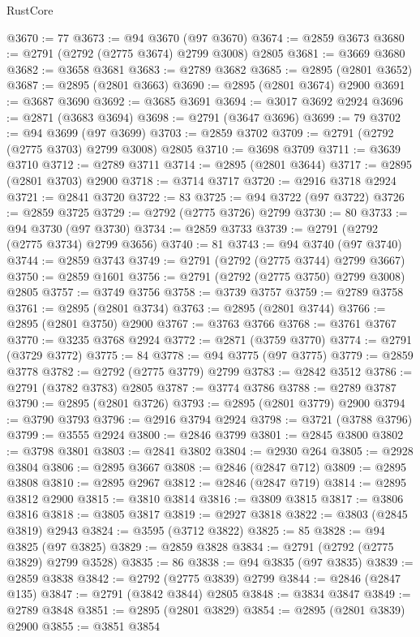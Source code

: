 \begin{lexlean}{RustCore}
\begin{coremodule}
@3670 := 77
@3673 := @94 @3670 (@97 @3670)
@3674 := @2859 @3673
@3680 := @2791 (@2792 (@2775 @3674) @2799 @3008) @2805
@3681 := @3669 @3680
@3682 := @3658 @3681
@3683 := @2789 @3682
@3685 := @2895 (@2801 @3652)
@3687 := @2895 (@2801 @3663)
@3690 := @2895 (@2801 @3674) @2900
@3691 := @3687 @3690
@3692 := @3685 @3691
@3694 := @3017 @3692 @2924
@3696 := @2871 (@3683 @3694)
@3698 := @2791 (@3647 @3696)
@3699 := 79
@3702 := @94 @3699 (@97 @3699)
@3703 := @2859 @3702
@3709 := @2791 (@2792 (@2775 @3703) @2799 @3008) @2805
@3710 := @3698 @3709
@3711 := @3639 @3710
@3712 := @2789 @3711
@3714 := @2895 (@2801 @3644)
@3717 := @2895 (@2801 @3703) @2900
@3718 := @3714 @3717
@3720 := @2916 @3718 @2924
@3721 := @2841 @3720
@3722 := 83
@3725 := @94 @3722 (@97 @3722)
@3726 := @2859 @3725
@3729 := @2792 (@2775 @3726) @2799
@3730 := 80
@3733 := @94 @3730 (@97 @3730)
@3734 := @2859 @3733
@3739 := @2791 (@2792 (@2775 @3734) @2799 @3656)
@3740 := 81
@3743 := @94 @3740 (@97 @3740)
@3744 := @2859 @3743
@3749 := @2791 (@2792 (@2775 @3744) @2799 @3667)
@3750 := @2859 @1601
@3756 := @2791 (@2792 (@2775 @3750) @2799 @3008) @2805
@3757 := @3749 @3756
@3758 := @3739 @3757
@3759 := @2789 @3758
@3761 := @2895 (@2801 @3734)
@3763 := @2895 (@2801 @3744)
@3766 := @2895 (@2801 @3750) @2900
@3767 := @3763 @3766
@3768 := @3761 @3767
@3770 := @3235 @3768 @2924
@3772 := @2871 (@3759 @3770)
@3774 := @2791 (@3729 @3772)
@3775 := 84
@3778 := @94 @3775 (@97 @3775)
@3779 := @2859 @3778
@3782 := @2792 (@2775 @3779) @2799
@3783 := @2842 @3512
@3786 := @2791 (@3782 @3783) @2805
@3787 := @3774 @3786
@3788 := @2789 @3787
@3790 := @2895 (@2801 @3726)
@3793 := @2895 (@2801 @3779) @2900
@3794 := @3790 @3793
@3796 := @2916 @3794 @2924
@3798 := @3721 (@3788 @3796)
@3799 := @3555 @2924
@3800 := @2846 @3799
@3801 := @2845 @3800
@3802 := @3798 @3801
@3803 := @2841 @3802
@3804 := @2930 @264
@3805 := @2928 @3804
@3806 := @2895 @3667
@3808 := @2846 (@2847 @712)
@3809 := @2895 @3808
@3810 := @2895 @2967
@3812 := @2846 (@2847 @719)
@3814 := @2895 @3812 @2900
@3815 := @3810 @3814
@3816 := @3809 @3815
@3817 := @3806 @3816
@3818 := @3805 @3817
@3819 := @2927 @3818
@3822 := @3803 (@2845 @3819) @2943
@3824 := @3595 (@3712 @3822)
@3825 := 85
@3828 := @94 @3825 (@97 @3825)
@3829 := @2859 @3828
@3834 := @2791 (@2792 (@2775 @3829) @2799 @3528)
@3835 := 86
@3838 := @94 @3835 (@97 @3835)
@3839 := @2859 @3838
@3842 := @2792 (@2775 @3839) @2799
@3844 := @2846 (@2847 @135)
@3847 := @2791 (@3842 @3844) @2805
@3848 := @3834 @3847
@3849 := @2789 @3848
@3851 := @2895 (@2801 @3829)
@3854 := @2895 (@2801 @3839) @2900
@3855 := @3851 @3854

\end{coremodule}
\end{lexlean}
